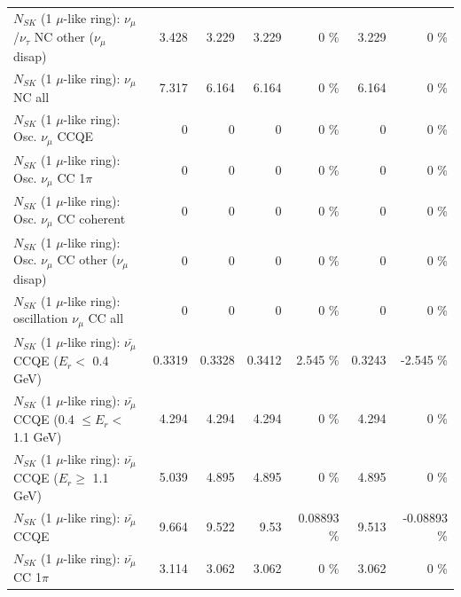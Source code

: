 \begin{table}
\begin{tabular}{| l | r | r | r  r | r  r |}
   $N_{SK}$ (1 $\mu$-like ring): $\nu_\mu$/$\nu_\tau$ NC other ($\nu_\mu$ disap) &           3.428 &           3.229 &           3.229 &        0 \%  &           3.229 &        0 \%  \\ 
                                $N_{SK}$ (1 $\mu$-like ring): $\nu_{\mu}$ NC all &           7.317 &           6.164 &           6.164 &        0 \%  &           6.164 &        0 \%  \\ 
\hline
\hline
                               $N_{SK}$ (1 $\mu$-like ring): Osc. $\nu_\mu$ CCQE &               0 &               0 &               0 &        0 \%  &               0 &        0 \%  \\ 
                          $N_{SK}$ (1 $\mu$-like ring): Osc. $\nu_\mu$ CC 1$\pi$ &               0 &               0 &               0 &        0 \%  &               0 &        0 \%  \\ 
                        $N_{SK}$ (1 $\mu$-like ring): Osc. $\nu_\mu$ CC coherent &               0 &               0 &               0 &        0 \%  &               0 &        0 \%  \\ 
         $N_{SK}$ (1 $\mu$-like ring): Osc. $\nu_\mu$ CC other ($\nu_\mu$ disap) &               0 &               0 &               0 &        0 \%  &               0 &        0 \%  \\ 
                      $N_{SK}$ (1 $\mu$-like ring): oscillation $\nu_\mu$ CC all &               0 &               0 &               0 &        0 \%  &               0 &        0 \%  \\ 
\hline
\hline
          $N_{SK}$ (1 $\mu$-like ring): $\bar{\nu_\mu}$ CCQE ($E_{r} <$ 0.4 GeV) &          0.3319 &          0.3328 &          0.3412 &    2.545 \%  &          0.3243 &   -2.545 \%  \\ 
 $N_{SK}$ (1 $\mu$-like ring): $\bar{\nu_\mu}$ CCQE (0.4 $\leq E_{r} <$ 1.1 GeV) &           4.294 &           4.294 &           4.294 &        0 \%  &           4.294 &        0 \%  \\ 
       $N_{SK}$ (1 $\mu$-like ring): $\bar{\nu_\mu}$ CCQE ($E_{r} \geq$ 1.1 GeV) &           5.039 &           4.895 &           4.895 &        0 \%  &           4.895 &        0 \%  \\ 
\hline
                              $N_{SK}$ (1 $\mu$-like ring): $\bar{\nu_\mu}$ CCQE &           9.664 &           9.522 &            9.53 &  0.08893 \%  &           9.513 & -0.08893 \%  \\ 
                         $N_{SK}$ (1 $\mu$-like ring): $\bar{\nu_\mu}$ CC 1$\pi$ &           3.114 &           3.062 &           3.062 &        0 \%  &           3.062 &        0 \%  \\ 

\end{tabular}
\end{table}
